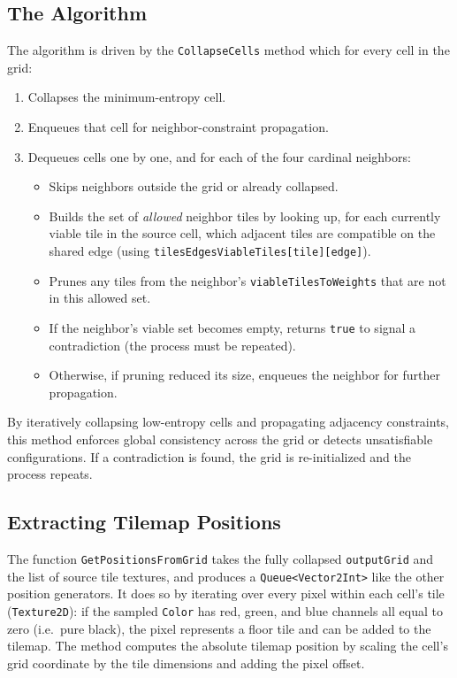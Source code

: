 \documentclass[a4paper, 12pt, one column, aas_macros]{article}
\begin{document}
\subsection{The Algorithm}
The algorithm is driven by the \texttt{CollapseCells} method which for every cell in the grid:
\begin{enumerate}
  \item Collapses the minimum-entropy cell.
  \item Enqueues that cell for neighbor-constraint propagation.
  \item Dequeues cells one by one, and for each of the four cardinal neighbors:
    \begin{itemize}
      \item Skips neighbors outside the grid or already collapsed.
      \item Builds the set of \emph{allowed} neighbor tiles by looking up, for each currently viable tile in the source cell, which adjacent tiles are compatible on the shared edge (using \texttt{tilesEdgesViableTiles[tile][edge]}).
      \item Prunes any tiles from the neighbor's \texttt{viableTilesToWeights} that are not in this allowed set.
      \item If the neighbor's viable set becomes empty, returns \texttt{true} to signal a contradiction (the process must be repeated).
      \item Otherwise, if pruning reduced its size, enqueues the neighbor for further propagation.
    \end{itemize}
\end{enumerate}

By iteratively collapsing low-entropy cells and propagating adjacency constraints, this method enforces global consistency across the grid or detects unsatisfiable configurations. If a contradiction is found, the grid is re-initialized and the process repeats.

\subsection{Extracting Tilemap Positions}
The function \texttt{GetPositionsFromGrid} takes the fully collapsed \texttt{outputGrid} and the list of source tile textures, and produces a \texttt{Queue<Vector2Int>} like the other position generators. It does so by iterating over every pixel within each cell's tile (\texttt{Texture2D}): if the sampled \texttt{Color} has red, green, and blue channels all equal to zero (i.e.\ pure black), the pixel represents a floor tile and can be added to the tilemap. The method computes the absolute tilemap position by scaling the cell's grid coordinate by the tile dimensions and adding the pixel offset.
\end{document}
